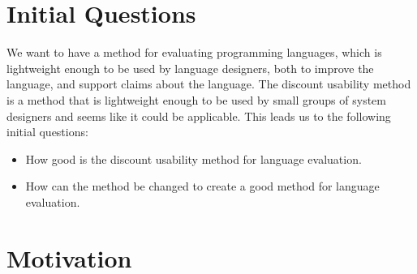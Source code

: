 \section{Initial Questions}
We want to have a method for evaluating programming languages, which is lightweight enough to be used by language designers, both to improve the language, and support claims about the language.
The discount usability method is a method that is lightweight enough to be used by small groups of system designers and seems like it could be applicable.
This leads us to the following initial questions:

\begin{itemize}
\item How good is the discount usability method for language evaluation.
\item How can the method be changed to create a good method for language evaluation.
\end{itemize}

\section{Motivation}